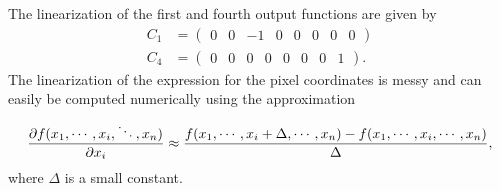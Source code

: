 {The linearization of the first and fourth output functions are given
by
\begin{align}
C_1 &= \begin{pmatrix} 0 & 0 & -1 & 0 & 0 & 0 & 0 & 0 \end{pmatrix} \\
C_4 &= \begin{pmatrix} 0 & 0 & 0 & 0 & 0 & 0 & 0 & 1 \end{pmatrix}.
\end{align}
The linearization of the expression for the pixel coordinates is
messy and can easily be computed numerically using the approximation
\[
\frac{\partial f(x_1, \cdots, x_i, \ddots, x_n)}{\partial x_i} \approx
\frac{f(x_1,\cdots,x_i+\Delta,\cdots,x_n) - f(x_1, \cdots, x_i,
\cdots, x_n)}{\Delta},
\]
where $\Delta$ is a small constant.

} %
